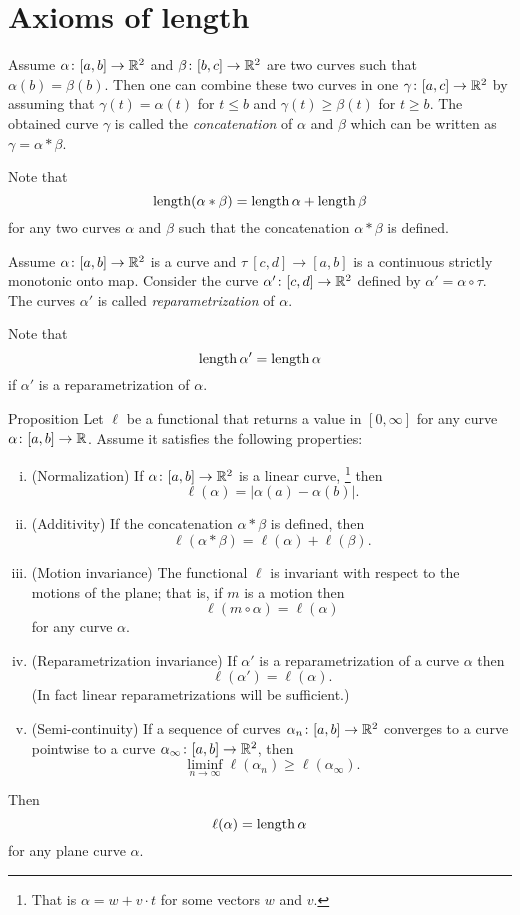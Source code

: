 \section{Axioms of length}

Assume $\alpha\colon[a,b]\to \mathbb{R}^2$ and $\beta\:[b,c]\z\to \RR^2$ are two curves such that $\alpha(b)=\beta(b)$.
Then one can combine these two curves in one $\gamma\:[a,c]\z\to \RR^2$ by assuming that $\gamma(t)=\alpha(t)$ for $t\le b$ and $\gamma(t)\ge\beta(t)$ for $t\ge b$.
The obtained curve $\gamma$ is called the 
\emph{concatenation} of $\alpha$ and $\beta$ which can be written as $\gamma=\alpha*\beta$.

Note that
\[\mathop{\rm length}\nolimits(\alpha*\beta)=\mathop{\rm length}\nolimits\alpha+\mathop{\rm length}\nolimits\beta\]
for any two curves $\alpha$ and $\beta$ such that the concatenation $\alpha*\beta$ is defined.

Assume $\alpha\colon[a,b]\to \mathbb{R}^2$ is a curve and $\tau\:[c,d]\to [a,b]$ is a continuous strictly monotonic onto map.
Consider the curve $\alpha'\colon[c,d]\to \mathbb{R}^2$ defined by $\alpha'=\alpha\circ\tau$.
The curves $\alpha'$ is called \emph{reparametrization} of $\alpha$.

Note that 
\[\mathop{\rm length}\nolimits\alpha'=\mathop{\rm length}\nolimits\alpha\]
if $\alpha'$ is a reparametrization of $\alpha$.




\begin{thm}{Proposition}\label{prop:length-axioms}
Let $\ell$ be a functional that returns a value in $[0,\infty]$ for any curve $\alpha\colon[a,b]\to\mathbb{R}$.
Assume it satisfies the following properties:
\begin{enumerate}[(i)]
\item\label{Normalization} (Normalization) If $\alpha\colon[a,b]\to \mathbb{R}^2$ is a linear curve,%
\footnote{That is $\alpha=w+v\cdot t$ for some vectors $w$ and $v$.} then
\[\ell(\alpha)=|\alpha(a)-\alpha(b)|.\]
\item\label{Additivity} (Additivity) If the concatenation $\alpha*\beta$ is defined, then
\[\ell(\alpha*\beta)=\ell(\alpha)+\ell(\beta).\]
\item\label{Motion invariance} (Motion invariance) The functional $\ell$ is invariant with respect to the motions of the plane; that is, if $m$ is a motion then 
\[\ell(m\circ\alpha)=\ell(\alpha)\]
for any curve $\alpha$.
\item\label{Reparametrization invariance} (Reparametrization invariance) If $\alpha'$ is a reparametrization of a curve $\alpha$ then
\[\ell(\alpha')=\ell(\alpha).\]
(In fact linear reparametrizations will be sufficient.)
\item\label{Semi-continuity} (Semi-continuity) If a sequence of curves $\alpha_n\colon[a,b]\to \mathbb{R}^2$ converges to a curve pointwise to a curve $\alpha_\infty\colon[a,b]\to \mathbb{R}^2$, then 
\[\liminf_{n\to\infty} \ell(\alpha_n) \ge \ell(\alpha_\infty).\]
\end{enumerate}
Then 
\[\ell(\alpha)=\mathop{\rm length}\nolimits \alpha\] 
for any plane curve $\alpha$.

\end{thm}

